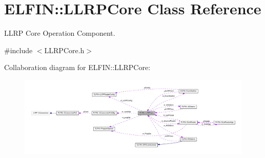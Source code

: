 \hypertarget{class_e_l_f_i_n_1_1_l_l_r_p_core}{\section{E\-L\-F\-I\-N\-:\-:L\-L\-R\-P\-Core Class Reference}
\label{class_e_l_f_i_n_1_1_l_l_r_p_core}
}


L\-L\-R\-P Core Operation Component.  




{\ttfamily \#include $<$L\-L\-R\-P\-Core.\-h$>$}



Collaboration diagram for E\-L\-F\-I\-N\-:\-:L\-L\-R\-P\-Core\-:
\nopagebreak
\begin{figure}[H]
\begin{center}
\leavevmode
\includegraphics[width=350pt]{class_e_l_f_i_n_1_1_l_l_r_p_core__coll__graph}
\end{center}
\end{figure}
